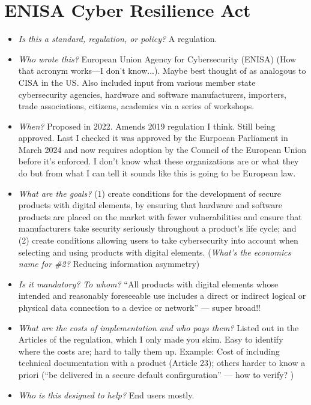\documentclass[11pt]{article}
\begin{document}

\section{ENISA Cyber Resilience Act}
\begin{itemize}
    \item {\it Is this a standard, regulation, or policy?} A regulation. 
    \item {\it Who wrote this?} European Union Agency for Cybersecurity (ENISA) (How that acronym works---I don't know...). Maybe best thought of as analogous to CISA in the US. Also included input from various member state cybersecurity agencies, hardware and software manufacturers, importers, trade associations, citizens, academics via a series of workshops. 
    \item {\it When?} Proposed in 2022. Amends 2019 regulation I think. Still being approved. Last I checked it was approved by the Eurpoean Parliament in March 2024 and now requires adoption by the Council of the European Union before it's enforced. I don't know what these organizations are or what they do but from what I can tell it sounds like this is going to be European law. 
    \item {\it What are the goals?} (1) create conditions for the development of secure products with digital elements, by ensuring that hardware and software products are placed on the market with fewer vulnerabilities and ensure that manufacturers take security seriously throughout a product's life cycle; and (2) create conditions allowing users to take cybersecurity into account when selecting and using products with digital elements. ({\it What's the economics name for \#2?} Reducing information asymmetry)
    \item {\it Is it mandatory? To whom?} ``All products with digital elements whose intended and reasonably foreseeable use includes a direct or indirect logical or physical data connection to a device or network'' --- super broad!!
    \item {\it What are the costs of implementation and who pays them?} Listed out in the Articles of the regulation, which I only made you skim. Easy to identify where the costs are; hard to tally them up. Example: Cost of including technical documentation with a product (Article 23); others harder to know a priori (``be delivered in a secure default confirguration'' --- how to verify? )
    \item {\it Who is this designed to help?} End users mostly. 

\end{itemize}
\end{document}
